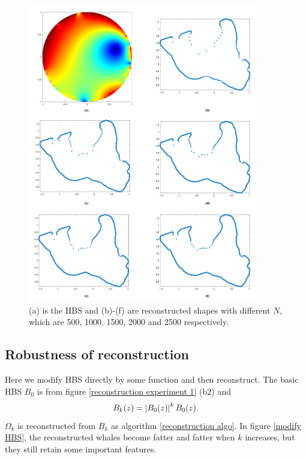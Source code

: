 \documentclass[review,onefignum,onetabnum]{siamonline190516}
\begin{document}
        \begin{figure}
            \begin{center}
                \includegraphics[width=10cm]{reconstruct_num.png}
            \end{center}
            \caption{(a) is the HBS and (b)-(f) are reconstructed shapes with different $N$, which are 500, 1000, 1500, 2000 and 2500 respectively.}
            \label{reconstruction experiment 2}
        \end{figure}

    \subsection{Robustness of reconstruction}
        Here we modify HBS directly by some function and then reconstruct.  The basic HBS $B_0$ is from figure \ref{reconstruction experiment 1} (b2) and
        \[
            B_k(z) = \left\vert B_0(z) \right\vert^k B_0(z).
        \]
        $\Omega_k$ is reconstructed from $B_k$ as algorithm \ref{reconstruction algo}. In figure \ref{modify HBS}, the reconstructed whales become fatter and fatter when $k$ increases, but they still retain some important features.
        
\end{document}
